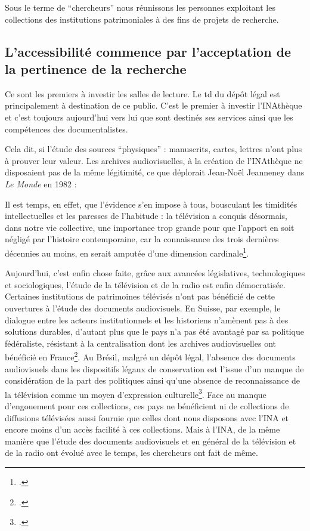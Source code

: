 
Sous le terme de \enquote{chercheurs} nous réunissons les personnes exploitant les collections des institutions patrimoniales à des fins de projets de recherche. 

\subsection{L'accessibilité commence par l'acceptation de la pertinence de la recherche}


Ce sont les premiers à investir les salles de lecture. Le \gls{td} du dépôt légal est principalement à destination de ce public. C'est le premier à investir l'INAthèque et c'est toujours aujourd'hui vers lui que sont destinés ses services ainsi que les compétences des documentalistes. 

Cela dit, si l'étude des sources \enquote{physiques} : manuscrits, cartes, lettres n'ont plus à prouver leur valeur. Les archives audiovisuelles, à la création de l'INAthèque ne disposaient pas de la même légitimité, ce que déplorait Jean-Noël Jeanneney dans \textit{Le Monde} en 1982 : 
\begin{displayquote}
	Il est temps, en effet, que l'évidence s'en impose à tous, bousculant les timidités intellectuelles et les paresses de l'habitude : la télévision a conquis désormais, dans notre vie collective, une importance trop grande pour que l'apport en soit négligé par l'histoire contemporaine, car la connaissance des trois dernières décennies au moins, en serait amputée d'une dimension cardinale\footcite[][10]{zotero-item-735}.
\end{displayquote}
Aujourd'hui, c'est enfin chose faite, grâce aux avancées législatives, technologiques et sociologiques, l'étude de la télévision et de la radio est enfin démocratisée. Certaines institutions de patrimoines télévisés n'ont pas bénéficié de cette ouvertures à l'étude des documents audiovisuels. En Suisse, par exemple, le dialogue entre les acteurs institutionnels et les historiens n'amènent pas à des solutions durables, d'autant plus que le pays n'a pas été avantagé par sa politique fédéraliste, résistant à la centralisation dont les archives audiovisuelles ont bénéficié en France\footcite[][27]{pradervand2013}. Au Brésil, malgré un dépôt légal, l'absence des documents audiovisuels dans les dispositifs légaux de conservation est l'issue d'un manque de considération de la part des politiques ainsi qu'une absence de reconnaissance de la télévision comme un moyen d'expression culturelle\footcite[][58]{Maria2013}. Face au manque d'engouement pour ces collections, ces pays ne bénéficient ni de collections de diffusions télévisées aussi fournie que celles dont nous disposons avec l'INA et encore moins d'un accès facilité à ces collections. Mais à l'INA, de la même manière que l'étude des documents audiovisuels et en général de la télévision et de la radio ont évolué avec le temps, les chercheurs ont fait de même.

